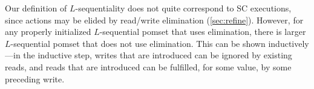 
Our definition of $L$-sequentiality does not quite correspond to SC
executions, since actions may be elided by read/write elimination
(\textsection\ref{sec:refine}).  However, for any properly initialized
$L$-sequential pomset that uses elimination, there is larger $L$-sequential
pomset that does not use elimination. This can be shown inductively---in the
inductive step, writes that are introduced can be ignored by existing reads,
and reads that are introduced can be fulfilled, for some value, by some
preceding write.

\endinput

\subsection{Proof chat}
  \textcolor{red}{WIP...}

  
  For such programs, we define up with a procedure that inductively generates
  all the pomsets in $\semmin{\aCmd}$.  It works very much like an opsem, but
  on $\rppo$-order, rather than full program order.

  In a minimal pomset, cross-thread order is only introduced by the
  requirement of fulfillment.

  Here's the procedure.  We are building pomset $\aPS$, with set $\aPSS'$ of
  possible extensions.  
  
